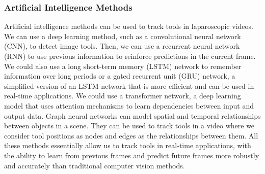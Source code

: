 \subsubsection{Artificial Intelligence Methods}

Artificial intelligence methods can be used to track tools in laparoscopic videos. We can use a deep learning method, such as a convolutional neural network (CNN), to detect image tools. Then, we can use a recurrent neural network (RNN) to use previous information to reinforce predictions in the current frame. We could also use a long short-term memory (LSTM) network to remember information over long periods or a gated recurrent unit (GRU) network, a simplified version of an LSTM network that is more efficient and can be used in real-time applications. We could use a transformer network, a deep learning model that uses attention mechanisms to learn dependencies between input and output data.  Graph neural networks can model spatial and temporal relationships between objects in a scene. They can be used to track tools in a video where we consider tool positions as nodes and edges as the relationships between them. All these methods essentially allow us to track tools in real-time applications, with the ability to learn from previous frames and predict future frames more robustly and accurately than traditional computer vision methods.


